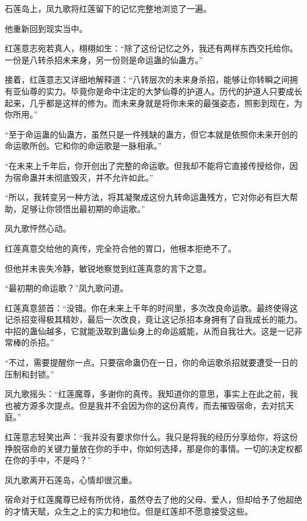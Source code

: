 
\begin{this_body}



石莲岛上，凤九歌将红莲留下的记忆完整地浏览了一遍。

他重新回到现实当中。

红莲意志宛若真人，栩栩如生：“除了这份记忆之外，我还有两样东西交托给你。一份是八转杀招未来身，另一份则是命运蛊的仙蛊方。”

接着，红莲意志又详细地解释道：“八转层次的未来身杀招，能够让你转瞬之间拥有亚仙尊的实力。毕竟你是命中注定的大梦仙尊的护道人。历代的护道人只要成长起来，几乎都是这样的修为。而未来身就是将你未来的最强姿态，照影到现在，为你所用。”

“至于命运蛊的仙蛊方，虽然只是一件残缺的蛊方，但它本就是依照你未来开创的命运歌所创。它和你的命运歌是一脉相承。”

“在未来上千年后，你开创出了完整的命运歌。但我却不能将它直接传授给你，因为宿命蛊并未彻底毁灭，并不允许如此。”

“所以，我转变另一种方法，将其凝聚成这份九转命运蛊残方，它对你必有巨大帮助，足够让你领悟出最初期的命运歌。”

凤九歌怦然心动。

红莲真意交给他的真传，完全符合他的胃口，他根本拒绝不了。

但他并未丧失冷静，敏锐地察觉到红莲真意的言下之意。

“最初期的命运歌？”凤九歌问道。

红莲真意颔首：“没错。你在未来上千年的时间里，多次改良命运歌。最终使得这记杀招变得极其精妙，最后一次改良，竟让这记杀招本身拥有了自我成长的能力。中招的蛊仙越多，它就能汲取到蛊仙身上的命运威能，从而自我壮大。这是一记非常棒的杀招。”

“不过，需要提醒你一点。只要宿命蛊仍在一日，你的命运歌杀招就要遭受一日的压制和封锁。”

凤九歌摇头：“红莲魔尊，多谢你的真传。我知道你的意思，事实上在此之前，我也被方源多次提点。但是我并不会因为你的这份真传，而去摧毁宿命，去对抗天庭。”

红莲意志轻笑出声：“我并没有要求你什么。我只是将我的经历分享给你，将这份挣脱宿命的关键力量放在你的手中，你如何选择，那是你的事情。一切的决定权都在你的手中，不是吗？”

凤九歌离开石莲岛，心情却很沉重。

宿命对于红莲魔尊已经有所优待，虽然夺去了他的父母、爱人，但却给予了他超绝的才情天赋，众生之上的实力和地位。但是红莲却不愿意接受这些。


\end{this_body}

